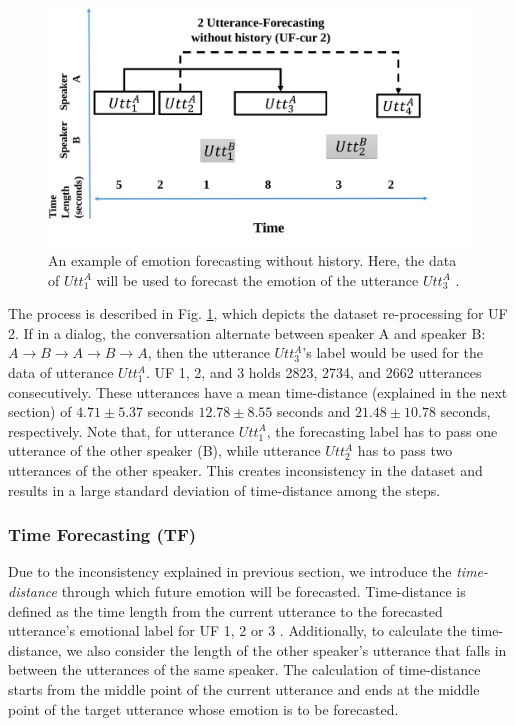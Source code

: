 \begin{figure}
\centering
   \includegraphics[width=0.6\linewidth]{Chapters/cur.pdf}
\caption[An example of emotion forecasting without history]{An example of emotion forecasting without history. Here, the data of $Utt_{1}^A$ will be used to forecast the emotion of the utterance $Utt_{3}^A$ .}
\label{fig:historyless}
\end{figure}

The process is described in Fig. \ref{fig:historyless}, which depicts the dataset re-processing for UF 2. If in a dialog, the conversation alternate between  speaker A and speaker B: $A \rightarrow B \rightarrow A \rightarrow B \rightarrow A$, then the utterance $Utt_{3}^A$'s label would be used for the data of utterance $Utt_{1}^A$. UF 1, 2, and 3 holds 2823, 2734, and 2662 utterances consecutively. These utterances have a mean time-distance (explained in the next section) of $4.71\pm5.37$ seconds $12.78 \pm8.55$ seconds and $21.48\pm10.78$  seconds, respectively. Note that, for utterance $Utt_{1}^A$, the forecasting label has to pass one utterance of the other speaker (B), while utterance $Utt_{2}^A$ has to pass two utterances of the other speaker. This creates inconsistency in the dataset and results in a large standard deviation of time-distance among the steps.


\subsubsection{Time Forecasting (TF)}
\label{time_grps}
Due to the inconsistency explained in previous section, we introduce  the \textit{time-distance} through which future emotion will be forecasted. Time-distance is defined as the time length from the current utterance to the forecasted utterance's emotional label for UF 1, 2 or 3 . Additionally, to calculate the time-distance, we also consider the length of the other speaker's utterance that falls in between the utterances of the same speaker. The calculation of time-distance starts from the middle point of the current utterance and ends at the middle point of the target utterance whose emotion is to be forecasted.

